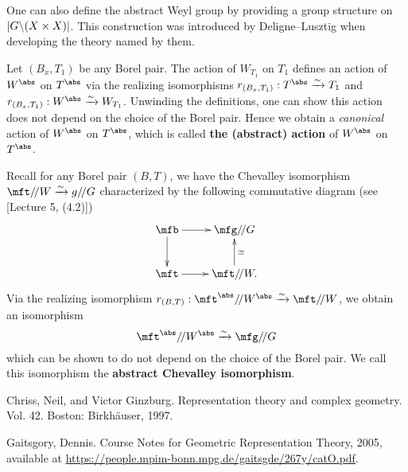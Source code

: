 	\begin{rem}
		One can also define the abstract Weyl group by providing a group structure on $|G\backslash (X\mt X)|$. This construction was introduced by Deligne--Lusztig when developing the theory named by them.

	\end{rem}

	\begin{constr}
		Let $(B_x,T_1)$ be any Borel pair. The action of $W_{T_1}$ on $T_1$ defines an action of $W^\abs$ on $T^\abs$ via the realizing isomorphisms $r_{(B_x,T_1)}: T^\abs \xrightarrow{\sim} T_1$ and $r_{(B_x,T_1)}: W^\abs \xrightarrow{\sim} W_{T_1}$. Unwinding the definitions, one can show this action does not depend on the choice of the Borel pair. Hence we obtain a \emph{canonical} action of $W^\abs$ on $T^\abs$, which is called \textbf{the (abstract) action} of $W^\abs$ on $T^\abs$.
	\end{constr}

	\begin{constr}
		Recall for any Borel pair $(B,T)$, we have the Chevalley isomorphism $\mft/\!/W \xrightarrow{\sim} g/\!/G$ characterized by the following commutative diagram (see [Lecture 5, (4.2)])
		\[
			\xymatrix{
				\mfb \ar[r] \ar[d] & \mfg/\!/G \\
				\mft \ar[r] & \mft/\!/W. \ar[u]_-\simeq
			}
		\]
		Via the realizing isomorphism $r_{(B,T)}: \mft^\abs/\!/W^\abs \xrightarrow{\sim} \mft/\!/W$, we obtain an isomorphism 
		\[
			\mft^\abs/\!/W^\abs \xrightarrow{\sim} \mfg/\!/G
		\]
		which can be shown to do not depend on the choice of the Borel pair. We call this isomorphism the \textbf{abstract Chevalley isomorphism}.
	\end{constr}



	
	
	

\begin{thebibliography}{Yau}

	 Chriss, Neil, and Victor Ginzburg. Representation theory and complex geometry. Vol. 42. Boston: Birkhäuser, 1997.
	

	 Gaitsgory, Dennis. Course Notes for Geometric Representation Theory, 2005, available at \url{https://people.mpim-bonn.mpg.de/gaitsgde/267y/catO.pdf}.

\end{thebibliography}


 


